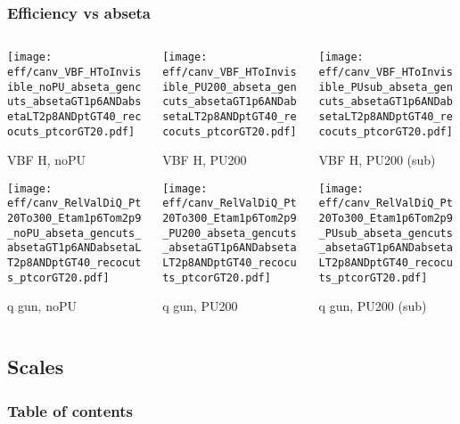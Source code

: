 \documentclass[8pt]{beamer}
\begin{document}
 \begin{frame}
  \frametitle{Efficiency vs abseta}
  
  \begin{columns}
   \begin{column}{0.35\textwidth}
     \texttt{[image: eff/canv\_VBF\_HToInvisible\_noPU\_abseta\_gencuts\_absetaGT1p6ANDabsetaLT2p8ANDptGT40\_recocuts\_ptcorGT20.pdf]}
     
     VBF H, noPU
    
     \texttt{[image: eff/canv\_RelValDiQ\_Pt20To300\_Etam1p6Tom2p9\_noPU\_abseta\_gencuts\_absetaGT1p6ANDabsetaLT2p8ANDptGT40\_recocuts\_ptcorGT20.pdf]}
     
     q gun, noPU
   \end{column}
   \begin{column}{0.35\textwidth}
     \texttt{[image: eff/canv\_VBF\_HToInvisible\_PU200\_abseta\_gencuts\_absetaGT1p6ANDabsetaLT2p8ANDptGT40\_recocuts\_ptcorGT20.pdf]}
     
     VBF H, PU200
    
     \texttt{[image: eff/canv\_RelValDiQ\_Pt20To300\_Etam1p6Tom2p9\_PU200\_abseta\_gencuts\_absetaGT1p6ANDabsetaLT2p8ANDptGT40\_recocuts\_ptcorGT20.pdf]}
     
     q gun, PU200
   \end{column}
   \begin{column}{0.35\textwidth}
     \texttt{[image: eff/canv\_VBF\_HToInvisible\_PUsub\_abseta\_gencuts\_absetaGT1p6ANDabsetaLT2p8ANDptGT40\_recocuts\_ptcorGT20.pdf]}
     
     VBF H, PU200 (sub)
    
     \texttt{[image: eff/canv\_RelValDiQ\_Pt20To300\_Etam1p6Tom2p9\_PUsub\_abseta\_gencuts\_absetaGT1p6ANDabsetaLT2p8ANDptGT40\_recocuts\_ptcorGT20.pdf]}
     
     q gun, PU200 (sub)
   \end{column}
  \end{columns}
 \end{frame}
 
  \subsection{Scales}

\begin{frame}
 \frametitle{Table of contents}
 
\end{frame}
\end{document}
